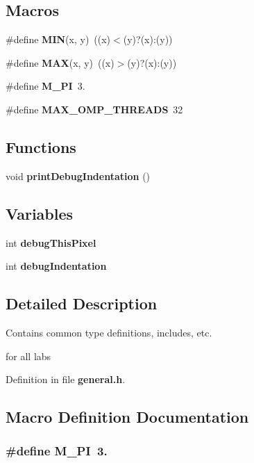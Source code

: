 \subsection*{Macros}
\begin{DoxyCompactItemize}
\item 
\#define {\bf M\+I\+N}(x, y)~((x)$<$(y)?(x)\+:(y))
\item 
\#define {\bf M\+A\+X}(x, y)~((x)$>$(y)?(x)\+:(y))
\item 
\#define {\bf M\+\_\+\+P\+I}~3.
\item 
\#define {\bf M\+A\+X\+\_\+\+O\+M\+P\+\_\+\+T\+H\+R\+E\+A\+D\+S}~32
\end{DoxyCompactItemize}
\subsection*{Functions}
\begin{DoxyCompactItemize}
\item 
void {\bf print\+Debug\+Indentation} ()
\end{DoxyCompactItemize}
\subsection*{Variables}
\begin{DoxyCompactItemize}
\item 
int {\bf debug\+This\+Pixel}
\item 
int {\bf debug\+Indentation}
\end{DoxyCompactItemize}


\subsection{Detailed Description}
Contains common type definitions, includes, etc. 

for all labs 

Definition in file {\bf general.\+h}.



\subsection{Macro Definition Documentation}
\subsubsection[{M\+\_\+\+P\+I}]{\setlength{\rightskip}{0pt plus 5cm}\#define M\+\_\+\+P\+I~3.}\label{general_8h_ae71449b1cc6e6250b91f539153a7a0d3}


